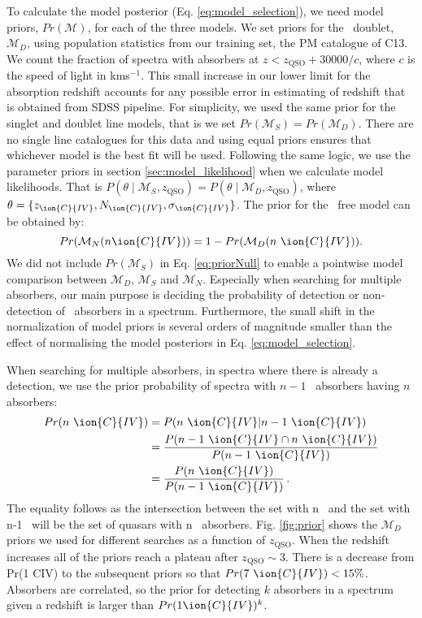 \documentclass[fleqn,usenatbib]{mnras}
\newcommand{\civ}{\ion{C}{IV}}
\newcommand{\nciv}{N_{\civ}} %
\newcommand{\zciv}{z_{\civ}}
\newcommand{\sciv}{\sigma_{\civ}}
\newcommand{\kms}{kms$^{-1}$} %
\newcommand{\zqso}{z_{\textrm{QSO}}}
\newcommand{\model}{\mathcal{M}}
\begin{document}
 To calculate the model posterior (Eq. \ref{eq:model_selection}),
  we need model priors, $Pr(\model)$, for each of the three models.
 We set priors for the \civ\ doublet, $\model_D$, using population statistics from our training set, the PM catalogue of C13.
 We count the fraction of spectra with absorbers at $z<\zqso + 30000 /c $,
 where $c$ is the speed of light in \kms.
 This small increase in our lower limit for the
 absorption redshift accounts for any possible error in estimating
 of redshift that is obtained from SDSS pipeline.
For simplicity, we used the same prior for the singlet and doublet line models, that
is we set $Pr(\model_S)=Pr(\model_D)$.
There are no single line catalogues for this data and using equal
priors ensures that whichever model is the best fit will be used.
Following the same logic, we use the  parameter priors in
section \ref{sec:model_likelihood} when we calculate model likelihoods.
That is $P(\theta\mid \model_{S}, \zqso) = P(\theta\mid \model_{D}, \zqso)$,
where $\theta = \{\zciv, \nciv, \sciv\}$.
The prior for the \civ\ free model can be obtained by:
\begin{equation}
  Pr(\model_N(n \civ)) = 1- Pr(\model_D(n~\civ)).
  \label{eq:priorNull}
\end{equation}
We did not include $Pr(\model_S)$ in Eq. \ref{eq:priorNull} to
enable a pointwise model comparison between $\model_D$, $\model_S$
and $\model_N$. Especially when searching for multiple absorbers, our
main purpose is deciding the probability of detection or non-detection
of \civ\ absorbers in a spectrum.
Furthermore, the small shift in the normalization of model
priors is several orders of magnitude smaller than the effect
of normalising the model posteriors in Eq. \ref{eq:model_selection}.

When searching for multiple absorbers, in spectra where there is already a detection, we use the prior probability of spectra with $n-1$ \civ\
 absorbers having $n$ absorbers:
\begin{align}
    Pr(n~ \civ) &=P(n~\civ|n-1~\civ)\\
    &= \frac{P(n-1 ~\civ \cap  n ~\civ)}{P(n-1 ~\civ)} \\
    &= \frac{P(n~\civ)}{P(n-1~\civ)}\,.
\end{align}
The equality follows as the intersection between the set with
 n \civ\ and the set with  n-1 \civ\ will be the set of quasars with   n \civ\ absorbers. Fig. \ref{fig:prior} shows the $\model_D$
priors we used for different searches as a function of $\zqso$.
When the redshift increases all of the priors reach a plateau  after $\zqso \sim 3$.
There is a  decrease from Pr(1 CIV) to the
subsequent priors so that $Pr(7 ~\civ) <15\%$.
Absorbers are correlated, so the prior for detecting $k$ absorbers in a spectrum given a redshift is larger than $Pr(1 \civ)^k$.
\end{document}
